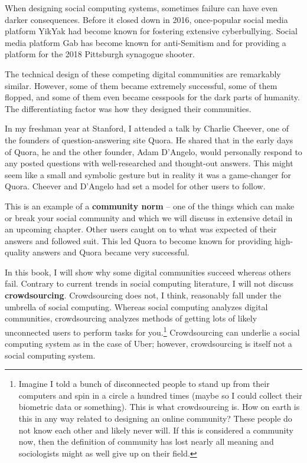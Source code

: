 \documentclass[class=book, crop=false]{standalone}
\providecommand{\keyterm}[1]{\textbf{#1}\marginnote{\scriptsize \textbf{#1}}}
\begin{document}
When designing social computing systems, sometimes failure can have even darker consequences. Before it closed down in 2016, once-popular social media platform YikYak had become known for fostering extensive cyberbullying. Social media platform Gab has become known for anti-Semitism and for providing a platform for the 2018 Pittsburgh synagogue shooter.

The technical design of these competing digital communities are remarkably similar. However, some of them became extremely successful, some of them flopped, and some of them even became cesspools for the dark parts of humanity. The differentiating factor was how they designed their communities.

In my freshman year at Stanford, I attended a talk by Charlie Cheever, one of the founders of question-answering site Quora. He shared that in the early days of Quora, he and the other founder, Adam D’Angelo, would personally respond to any posted questions with well-researched and thought-out answers. This might seem like a small and symbolic gesture but in reality it was a game-changer for Quora. Cheever and D’Angelo had set a model for other users to follow.

This is an example of a \keyterm{community norm} -- one of the things which can make or break your social community and which we will discuss in extensive detail in an upcoming chapter. Other users caught on to what was expected of their answers and followed suit. This led Quora to become known for providing high-quality answers and Quora became very successful.

In this book, I will show why some digital communities succeed whereas others fail. Contrary to current trends in social computing literature, I will not discuss \keyterm{crowdsourcing}. Crowdsourcing does not, I think, reasonably fall under the umbrella of social computing. Whereas social computing analyzes digital communities, crowdsourcing analyzes methods of getting lots of likely unconnected users to perform tasks for you.\footnote{Imagine I told a bunch of disconnected people to stand up from their computers and spin in a circle a hundred times (maybe so I could collect their biometric data or something). This is what crowdsourcing is. How on earth is this in any way related to designing an online community? These people do not know each other and likely never will. If this is considered a community now, then the definition of community has lost nearly all meaning and sociologists might as well give up on their field.} Crowdsourcing can underlie a social computing system as in the case of Uber; however, crowdsourcing is itself not a social computing system.
\end{document}
